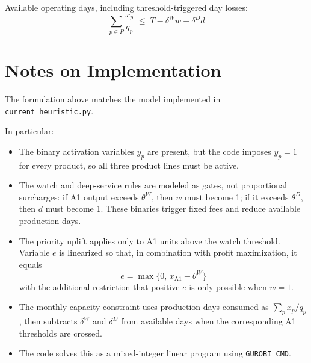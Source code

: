 Available operating days, including threshold-triggered day losses:
\[
\sum_{p \in P} \frac{x_p}{q_p}
\;\le\;
T - \delta^{W} w - \delta^{D} d
\]

\section*{Notes on Implementation}

The formulation above matches the model implemented in \texttt{current\_heuristic.py}.

In particular:
\begin{itemize}
    \item The binary activation variables \(y_p\) are present, but the code imposes \(y_p=1\) for every product, so all three product lines must be active.
    \item The watch and deep-service rules are modeled as gates, not proportional surcharges: if A1 output exceeds \(\theta^W\), then \(w\) must become 1; if it exceeds \(\theta^D\), then \(d\) must become 1. These binaries trigger fixed fees and reduce available production days.
    \item The priority uplift applies only to A1 units above the watch threshold. Variable \(e\) is linearized so that, in combination with profit maximization, it equals
    \[
    e = \max\{0,\, x_{\text{A1}}-\theta^W\}
    \]
    with the additional restriction that positive \(e\) is only possible when \(w=1\).
    \item The monthly capacity constraint uses production days consumed as \(\sum_p x_p/q_p\), then subtracts \(\delta^W\) and \(\delta^D\) from available days when the corresponding A1 thresholds are crossed.
    \item The code solves this as a mixed-integer linear program using \texttt{GUROBI\_CMD}.
\end{itemize}
